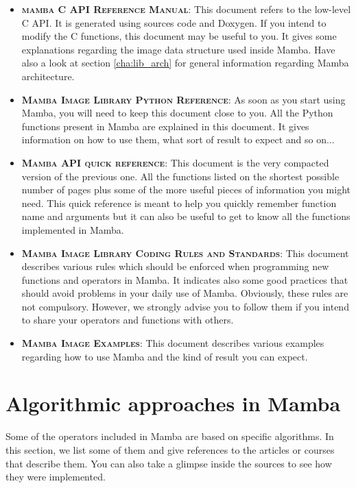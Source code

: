 \documentclass[a4paper,10pt,oneside]{article}
\begin{document}
\begin{itemize}
\item \textbf{\textsc{mamba C API Reference Manual}}: This document refers to the
low-level C API. It is generated using sources code and Doxygen. If you intend 
to modify the C functions, this document may be useful to you. It gives some
explanations regarding the image data structure used inside Mamba. Have also
a look at section \ref{cha:lib_arch} for general information regarding Mamba
architecture.
\item \textbf{\textsc{Mamba Image Library Python Reference}}: As soon as you
start using Mamba, you will need to keep this document close to you. All the
Python functions present in Mamba are explained in this document. It gives
information on how to use them, what sort of result to expect and so on... 
\item \textbf{\textsc{Mamba API quick reference}}: This document is the very
compacted version of the previous one. All the functions listed on the shortest
possible number of pages plus some of the more useful pieces of information you
might need. This quick reference is meant to help you quickly remember function
name and arguments but it can also be useful to get to know all the functions
implemented in Mamba.
\item \textbf{\textsc{Mamba Image Library Coding Rules and Standards}}: This
document describes various rules which should be enforced when programming new
functions and operators in Mamba. It indicates also some good practices that
should avoid problems in your daily use of Mamba. Obviously, these rules are not
compulsory. However, we strongly advise you to follow them if you intend to share
your operators and functions with others.
\item \textbf{\textsc{Mamba Image Examples}}: This document describes various
examples regarding how to use Mamba and the kind of result you can expect.
\end{itemize}

\pagebreak

\section{Algorithmic approaches in Mamba}

Some of the operators included in Mamba are based on specific algorithms.
In this section, we list some of them and give references to the articles or 
courses that describe them. You can also take a glimpse inside the sources to
see how they were implemented.
\end{document}
